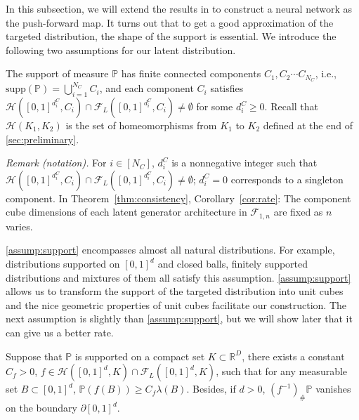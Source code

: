 In this subsection, we will extend the results in \cite{perekrestenkoHighDimensionalDistributionGeneration2022a} to construct a neural network as the push-forward map. It turns out that to get a good approximation of the targeted distribution, the shape of the support is essential. We introduce the following two assumptions for our latent distribution.
\begin{assumption}\label{assump:support}
    The support of measure $ \mathbb{P}$ has finite connected components $ C_{1} ,C_{2} \cdots C_{N_C} $, i.e., $ {\text{supp}(\mathbb{P})} =\bigcup _{i=1}^{N_C} C_{i}$, and each component $ C_{i}$ satisfies $\mathcal{H}([0,1]^{d^C_i},C_i) \cap \mathcal{F}_L([0,1]^{d^C_i},C_i) \neq \emptyset$ for some $d_i^C \geqslant 0$. Recall that $\mathcal{H}(K_1,K_2)$ is the set of homeomorphisms from $K_1$ to $K_2$ defined at the end of  \cref{sec:preliminary}. 
\end{assumption}

\noindent\textit{Remark (notation).} For $i\in[N_C]$, $d_i^C$ is a nonnegative integer such that $\mathcal{H}([0,1]^{d_i^C},C_i)\cap\mathcal{F}_L([0,1]^{d_i^C},C_i)\neq\emptyset$; $d_i^C=0$ corresponds to a singleton component. In Theorem~\ref{thm:consistency}, Corollary~\ref{cor:rate}: The component cube dimensions of each latent generator architecture in $\mathcal F_{1,n}$ are fixed as $n$ varies.

 \cref{assump:support} encompasses almost all natural distributions. For example, distributions supported on $ [0,1]^d $ and closed balls, finitely supported distributions and mixtures of them all satisfy this assumption. \cref{assump:support} allows us to transform the support of the targeted distribution into unit cubes and the nice geometric properties of unit cubes facilitate our construction. The next assumption is slightly than \cref{assump:support}, but we will show later that it can give us a better rate.\par   

\begin{assumption}\label{assumption:lower_bound}
Suppose that $ \mathbb{P}$ is supported on a compact set $ K\subset \mathbb{R}^{D}$, there exists a constant $ C_{f}  >0$, $ f\in \mathcal{H}([0,1]^{d},K) \cap \mathcal{F}_L([0,1]^{d},K)$,  such that for any measurable set $ B\subset [ 0,1]^{d}$, $ \mathbb{P}\left( f( B)\right) \geqslant C_{f} \lambda ( B)$. Besides, if $d>0$, $(f^{-1})_{\#}\mathbb P$ vanishes on the boundary $\partial[0,1]^d$.
\end{assumption}

